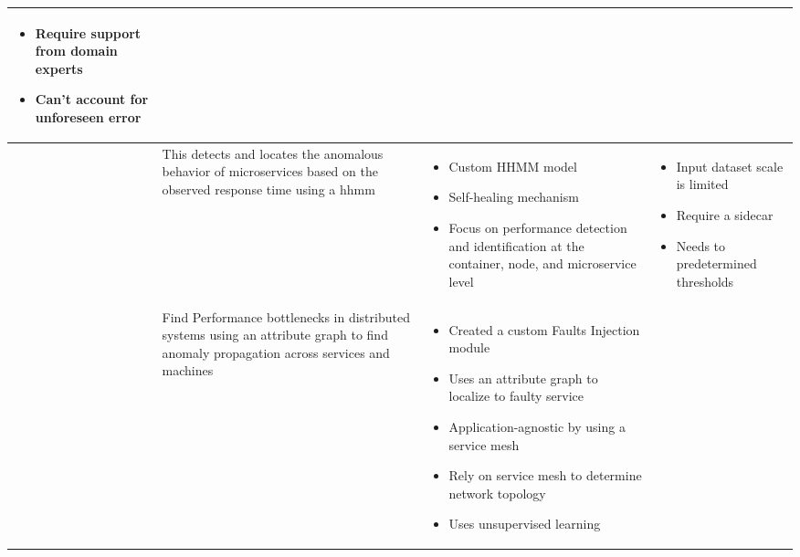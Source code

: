 \begin{longtable}{| p{20mm} | p{43mm} | p{43mm} | p{43mm} |}
\begin{itemize}[leftmargin=*,noitemsep,nolistsep]
    \item Require support from domain experts
    \item Can't account for unforeseen error
  \vspace{-7mm}
  \end{itemize} \\ \hline
  \cite{samir2019dla} &
  This detects and locates the anomalous behavior of microservices based on the observed response time using a \ac{hhmm} &
  \vspace{-8mm}
  \begin{itemize}[leftmargin=*,noitemsep,nolistsep] 
    \item Custom HHMM model
    \item Self-healing mechanism
    \item Focus on performance detection and identification at the container, node, and microservice level
  \vspace{-7mm}
  \end{itemize} &
  \vspace{-8mm}
  \begin{itemize}[leftmargin=*,noitemsep,nolistsep] 
    \item Input dataset scale is limited
    \item Require a sidecar
    \item Needs to predetermined thresholds
  \vspace{-7mm}
  \end{itemize} \\ \hline
  \cite{wu2020microrca} &
  Find Performance bottlenecks in distributed systems using an attribute graph to find anomaly propagation across services and machines &
  \vspace{-8mm}
  \begin{itemize}[leftmargin=*,noitemsep,nolistsep] 
    \item Created a custom Faults Injection module
    \item Uses an attribute graph to localize to faulty service
    \item Application-agnostic by using a service mesh
    \item Rely on service mesh to determine network topology
    \item Uses unsupervised learning
  \vspace{-7mm}
  \end{itemize} &
  \vspace{-8mm}
  \begin{itemize}[leftmargin=*,noitemsep,nolistsep] 

\end{itemize}
\end{longtable}
